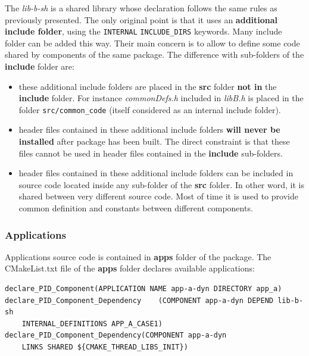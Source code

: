 \documentclass[12pt,a4paper]{article}
\begin{document}
The \textit{lib-b-sh} is a shared library whose declaration follows the same rules as previously presented. The only original point is that it uses an \textbf{additional include folder}, using the \texttt{INTERNAL} \texttt{INCLUDE\_DIRS} keywords. Many include folder can be added this way. Their main concern is to allow to define some code shared by components of the same package. The difference with sub-folders of the \textbf{include} folder are:
\begin{itemize}
\item these additional include folders are placed in the \textbf{src} folder \textbf{not in} the \textbf{include} folder. For instance \textit{commonDefs.h} included in \textit{libB.h} is placed in the folder \texttt{src/common\_code} (itself considered as an internal include folder).
\item header files contained in these additional include folders \textbf{will never be installed} after package has been built. The direct constraint is that these files cannot be used in header files contained in the \textbf{include} sub-folders.
\item header files contained in these additional include folders can be included in source code located inside any sub-folder of the \textbf{src} folder. In other word, it is shared between very different source code. Most of time it is used to provide common definition and constants between different components.
\end{itemize}

\subsubsection{Applications}

Applications source code is contained in \textbf{apps} folder of the package. The CMakeList.txt file of the \textbf{apps} folder declares available applications:
\begin{verbatim}
declare_PID_Component(APPLICATION NAME app-a-dyn DIRECTORY app_a)
declare_PID_Component_Dependency	(COMPONENT app-a-dyn DEPEND lib-b-sh
    INTERNAL_DEFINITIONS APP_A_CASE1)
declare_PID_Component_Dependency(COMPONENT app-a-dyn 
    LINKS SHARED ${CMAKE_THREAD_LIBS_INIT})
\end{verbatim}
\end{document}
